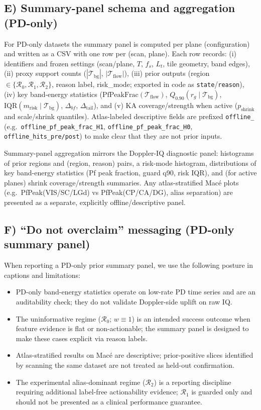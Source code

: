 \documentclass[11pt]{article}
\begin{document}
\subsection*{E) Summary-panel schema and aggregation (PD-only)}
For PD-only datasets the summary panel is computed per plane (configuration) and written as a CSV with one row per (scan, plane). Each row records: (i) identifiers and frozen settings (scan/plane, $T$, $f_s$, $L_t$, tile geometry, band edges), (ii) proxy support counts ($|\mathcal{T}_{\mathrm{bg}}|$, $|\mathcal{T}_{\mathrm{flow}}|$), (iii) prior outputs (region $\in\{\mathcal{R}_0,\mathcal{R}_1,\mathcal{R}_2\}$, reason label, risk\_mode; exported in code as \texttt{state}/\texttt{reason}), (iv) key band-energy statistics ($\mathrm{PfPeakFrac}(\mathcal{T}_{\mathrm{flow}})$, $Q_{0.90}(r_g\mid\mathcal{T}_{\mathrm{bg}})$, $\mathrm{IQR}(m_{\mathrm{risk}}\mid\mathcal{T}_{\mathrm{bg}})$, $\Delta_{bf}$, $\Delta_{\mathrm{tail}}$), and (v) KA coverage/strength when active ($p_{\mathrm{shrink}}$ and scale/shrink quantiles). Atlas-labeled descriptive fields are prefixed \texttt{offline\_} (e.g.\ \texttt{offline\_pf\_peak\_frac\_H1}, \texttt{offline\_pf\_peak\_frac\_H0}, \texttt{offline\_hits\_pre/post}) to make clear that they are not prior inputs.

Summary-panel aggregation mirrors the Doppler-IQ diagnostic panel: histograms of prior regions and (region, reason) pairs, a risk-mode histogram, distributions of key band-energy statistics (Pf peak fraction, guard q90, risk IQR), and (for active planes) shrink coverage/strength summaries. Any atlas-stratified Mac{\'e} plots (e.g.\ PfPeak(VIS/SC/LGd) vs PfPeak(CP/CA/DG), alias separation) are presented as a separate, explicitly offline/descriptive panel.

\subsection*{F) ``Do not overclaim'' messaging (PD-only summary panel)}
When reporting a PD-only prior summary panel, we use the following posture in captions and limitations:
\begin{itemize}[nosep]
  \item PD-only band-energy statistics operate on low-rate PD time series and are an auditability check; they do not validate Doppler-side uplift on raw IQ.
  \item The uninformative regime ($\mathcal{R}_0$; $w\equiv 1$) is an intended success outcome when feature evidence is flat or non-actionable; the summary panel is designed to make these cases explicit via reason labels.
  \item Atlas-stratified results on Mac{\'e} are descriptive; prior-positive slices identified by scanning the same dataset are not treated as held-out confirmation.
  \item The experimental alias-dominant regime ($\mathcal{R}_2$) is a reporting discipline requiring additional label-free actionability evidence; $\mathcal{R}_1$ is guarded only and should not be presented as a clinical performance guarantee.
\end{itemize}
\end{document}

